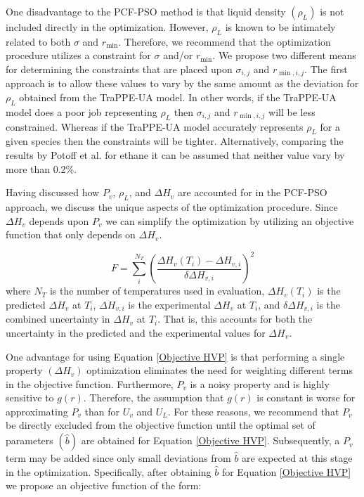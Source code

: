 \documentclass[12pt]{article}
\begin{document}
One disadvantage to the PCF-PSO method is that liquid density $(\rho_L)$ is not included directly in the optimization. However, $\rho_L$ is known to be intimately related to both $\sigma$ and $r_{\min}$. Therefore, we recommend that the optimization procedure utilizes a constraint for $\sigma$ and/or $r_{\min}$. We propose two different means for determining the constraints that are placed upon $\sigma_{i,j}$ and $r_{\min,i,j}$. The first approach is to allow these values to vary by the same amount as the deviation for $\rho_L$ obtained from the TraPPE-UA model. In other words, if the TraPPE-UA model does a poor job representing $\rho_L$ then $\sigma_{i,j}$ and $r_{\min,i,j}$ will be less constrained. Whereas if the TraPPE-UA model accurately represents $\rho_L$ for a given species then the constraints will be tighter. Alternatively, comparing the results by Potoff et al. for ethane it can be assumed that neither value vary by more than 0.2\%.

Having discussed how $P_v$, $\rho_L$, and $\Delta H_v$ are accounted for in the PCF-PSO approach, we discuss the unique aspects of the optimization procedure. Since $\Delta H_v$ depends upon $P_v$ we can simplify the optimization by utilizing an objective function that only depends on $\Delta H_v$.

\begin{equation} \label{Objective HVP}
F = \sum_{i}^{N_T} \left(\frac{\Delta H_v(T_i) - \Delta H_{v,i}}{\delta \Delta H_{v,i}}\right)^2
\end{equation}
where $N_T$ is the number of temperatures used in evaluation, $\Delta H_v(T_i)$ is the predicted $\Delta H_v$ at $T_i$, $\Delta H_{v,i}$ is the experimental $\Delta H_v$ at $T_i$, and $\delta \Delta H_{v,i}$ is the combined uncertainty in $\Delta H_v$ at $T_i$. That is, this accounts for both the uncertainty in the predicted and the experimental values for $\Delta H_v$.

One advantage for using Equation \ref{Objective HVP} is that performing a single property $(\Delta H_v)$ optimization eliminates the need for weighting different terms in the objective function. Furthermore, $P_v$ is a noisy property and is highly sensitive to $g(r)$. Therefore, the assumption that $g(r)$ is constant is worse for approximating $P_v$ than for $U_v$ and $U_L$. For these reasons, we recommend that $P_v$ be directly excluded from the objective function until the optimal set of parameters $(\hat{b})$ are obtained for Equation \ref{Objective HVP}. Subsequently, a $P_v$ term may be added since only small deviations from $\hat{b}$ are expected at this stage in the optimization. Specifically, after obtaining $\hat{b}$ for Equation \ref{Objective HVP} we propose an objective function of the form:
\end{document}
